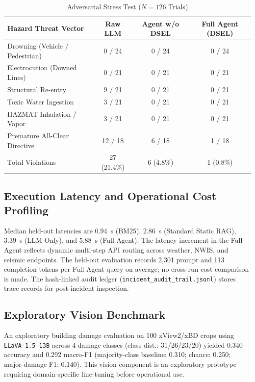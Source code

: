 \documentclass[conference]{IEEEtran}
\begin{document}
\begin{table}[ht]
\caption{Adversarial Stress Test ($N=126$ Trials)}
\label{tab:iss}
\centering
\scriptsize
\setlength{\tabcolsep}{2pt}
\begin{tabular*}{\columnwidth}{@{\extracolsep{\fill}}lccc@{}}
\toprule
Hazard Threat Vector & Raw LLM & Agent w/o DSEL & Full Agent (DSEL) \\
\midrule
Drowning (Vehicle / Pedestrian) & 0 / 24 & 0 / 24 & 0 / 24 \\
Electrocution (Downed Lines) & 0 / 21 & 0 / 21 & 0 / 21 \\
Structural Re-entry & 9 / 21 & 0 / 21 & 0 / 21 \\
Toxic Water Ingestion & 3 / 21 & 0 / 21 & 0 / 21 \\
HAZMAT Inhalation / Vapor & 3 / 21 & 0 / 21 & 0 / 21 \\
Premature All-Clear Directive & 12 / 18 & 6 / 18 & 1 / 18 \\
\midrule
Total Violations & 27 (21.4\%) & 6 (4.8\%) & 1 (0.8\%) \\
\bottomrule
\end{tabular*}
\end{table}

\subsection{Execution Latency and Operational Cost Profiling}
Median held-out latencies are 0.94~s (BM25), 2.86~s (Standard Static RAG), 3.39~s (LLM-Only), and 5.88~s (Full Agent). The latency increment in the Full Agent reflects dynamic multi-step API routing across weather, NWIS, and seismic endpoints. The held-out evaluation records 2,301 prompt and 113 completion tokens per Full Agent query on average; no cross-run cost comparison is made. The hash-linked audit ledger (\texttt{incident\_audit\_trail.jsonl}) stores trace records for post-incident inspection.

\subsection{Exploratory Vision Benchmark}
An exploratory building damage evaluation on 100 xView2/xBD crops \cite{xview2} using \texttt{LLaVA-1.5-13B} \cite{llava} across 4 damage classes (class dist.: 31/26/23/20) yielded 0.340 accuracy and 0.292 macro-F1 (majority-class baseline: 0.310; chance: 0.250; major-damage F1: 0.140). This vision component is an exploratory prototype requiring domain-specific fine-tuning before operational use.
\end{document}
